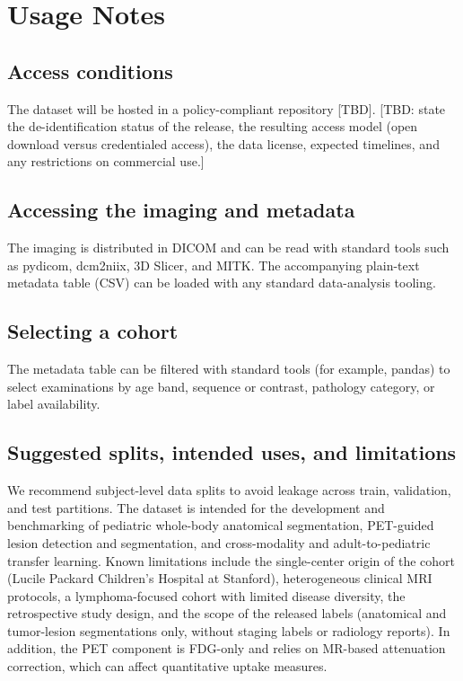 
\section*{Usage Notes}\label{sec:usage}

\subsection*{Access conditions}\label{subsec:license}
The dataset will be hosted in a policy-compliant repository [TBD].
[TBD: state the de-identification status of the release, the resulting access model (open download versus credentialed access), the data license, expected timelines, and any restrictions on commercial use.]

\subsection*{Accessing the imaging and metadata}\label{subsec:access}
The imaging is distributed in DICOM and can be read with standard tools such as pydicom, dcm2niix, 3D Slicer, and MITK.
The accompanying plain-text metadata table (CSV) can be loaded with any standard data-analysis tooling.

\subsection*{Selecting a cohort}\label{subsec:query}
The metadata table can be filtered with standard tools (for example, pandas) to select examinations by age band, sequence or contrast, pathology category, or label availability.

\subsection*{Suggested splits, intended uses, and limitations}\label{subsec:limits}
We recommend subject-level data splits to avoid leakage across train, validation, and test partitions.
The dataset is intended for the development and benchmarking of pediatric whole-body anatomical segmentation, PET-guided lesion detection and segmentation, and cross-modality and adult-to-pediatric transfer learning.
Known limitations include the single-center origin of the cohort (Lucile Packard Children's Hospital at Stanford), heterogeneous clinical MRI protocols, a lymphoma-focused cohort with limited disease diversity, the retrospective study design, and the scope of the released labels (anatomical and tumor-lesion segmentations only, without staging labels or radiology reports).
In addition, the PET component is FDG-only and relies on MR-based attenuation correction, which can affect quantitative uptake measures.
